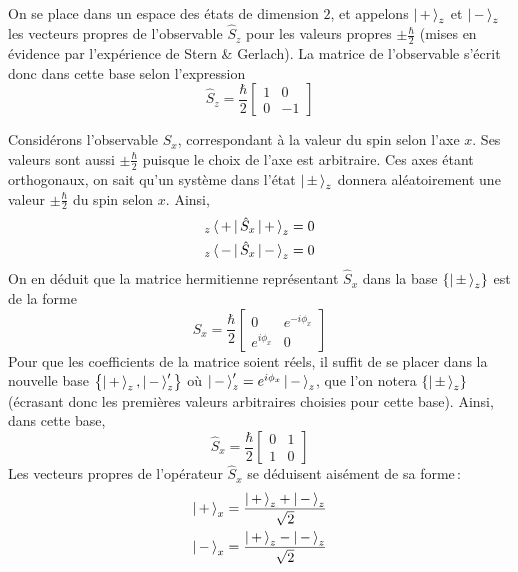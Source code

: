         \begin{demo}
            On se place dans un espace des états de dimension $2$, et appelons $\left| \, + \, \right>_z$ et $\left| \, - \, \right>_z$ les vecteurs propres de l’observable $\hat{S}_z$ pour les valeurs propres $\pm \frac{\hbar}{2}$ (mises en évidence par l’expérience de Stern \& Gerlach). La matrice de l’observable s’écrit donc dans cette base selon l’expression 
        \[ \hat{S}_z = \frac{\hbar}{2} \begin{bmatrix}
            1 & 0 \\
            0 & -1
        \end{bmatrix} \]

        Considérons l’observable $\hat{S}_x$, correspondant à la valeur du spin selon l’axe $x$. Ses valeurs sont aussi $\pm \frac{\hbar}{2}$ puisque le choix de l’axe est arbitraire. Ces axes étant orthogonaux, on sait qu’un système dans l’état $\left| \, \pm \, \right>_z$ donnera aléatoirement une valeur $\pm \frac{\hbar}{2}$ du spin selon $x$. Ainsi, 
        \begin{align*}
            _z\left< \, + \, \right| \hat{S}_x \left| \, + \, \right>_z &= 0 \\
            _z\left< \, - \, \right| \hat{S}_x \left| \, - \, \right>_z &= 0
        \end{align*}
        On en déduit que la matrice hermitienne représentant $\hat{S}_x$ dans la base $\left\{\left| \, \pm \, \right>_z\right\}$ est de la forme
        \[ \hat{S}_x = \frac{\hbar}{2} \begin{bmatrix}
            0 & e^{-i\phi_x} \\
            e^{i\phi_x} & 0
        \end{bmatrix} \]
        Pour que les coefficients de la matrice soient réels, il suffit de se placer dans la nouvelle base $\left\{\left| \, + \, \right>_z, \left| \, - \, \right>'_z\right\}$ où $\left| \, - \, \right>'_z = e^{i \phi_x} \left| \, - \, \right>_z$, que l’on notera $\left\{\left| \, \pm \, \right>_z\right\}$ (écrasant donc les premières valeurs arbitraires choisies pour cette base). Ainsi, dans cette base, 
        \[ \hat{S}_x = \frac{\hbar}{2} \begin{bmatrix}
            0 & 1 \\
            1 & 0
        \end{bmatrix} \]
        Les vecteurs propres de l’opérateur $\hat{S}_x$ se déduisent aisément de sa forme :
        \begin{align*}
            \ket{+}_x &= \frac{\ket{+}_z + \ket{-}_z}{\sqrt{2}} \\
            \ket{-}_x &= \frac{\ket{+}_z - \ket{-}_z}{\sqrt{2}} \\

\end{align*}
\end{demo}
